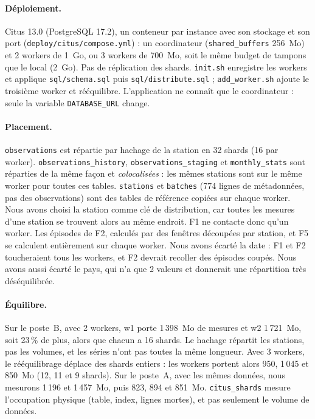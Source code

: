 \documentclass{rapportClass}
\newcommand{\cmd}[1]{\texttt{#1}}
\begin{document}
\paragraph{Déploiement.} Citus 13.0 (PostgreSQL 17.2), un conteneur par instance avec son stockage et son port
(\cmd{deploy/citus/compose.yml}) : un coordinateur (\cmd{shared\_buffers} 256~Mo) et 2 workers de 1~Go, ou 3 workers
de 700~Mo, soit le même budget de tampons que le local (2~Go). Pas de réplication des shards.
\cmd{init.sh} enregistre les workers et applique \cmd{sql/schema.sql} puis \cmd{sql/distribute.sql} ;
\cmd{add\_worker.sh} ajoute le troisième worker et rééquilibre. L'application ne connaît que le coordinateur :
seule la variable \cmd{DATABASE\_URL} change.

\paragraph{Placement.} \cmd{observations} est répartie par hachage de la station en 32 shards (16 par worker).
\cmd{observations\_history}, \cmd{observations\_staging} et \cmd{monthly\_stats} sont réparties de la même façon et
\emph{colocalisées} : les mêmes stations sont sur le même worker pour toutes ces tables. \cmd{stations} et
\cmd{batches} (774 lignes de métadonnées, pas des observations) sont des tables de référence copiées sur chaque worker.
Nous avons choisi la station comme clé de distribution, car toutes les mesures d'une station se trouvent alors
au même endroit. F1 ne contacte donc qu'un worker. Les épisodes de F2, calculés par des fenêtres découpées par
station, et F5 se calculent entièrement sur chaque worker. Nous avons écarté la date : F1 et F2 toucheraient
tous les workers, et F2 devrait recoller des épisodes coupés. Nous avons aussi écarté le pays, qui n'a que
2 valeurs et donnerait une répartition très déséquilibrée.

\paragraph{Équilibre.} Sur le poste~B, avec 2 workers, w1 porte 1\,398~Mo de mesures et w2 1\,721~Mo, soit
23\,\% de plus, alors que chacun a 16 shards. Le hachage répartit les stations, pas les volumes, et les séries
n'ont pas toutes la même longueur. Avec 3 workers, le rééquilibrage déplace des shards entiers : les workers
portent alors 950, 1\,045 et 850~Mo (12, 11 et 9 shards). Sur le poste~A, avec les mêmes données, nous mesurons
1\,196 et 1\,457~Mo, puis 823, 894 et 851~Mo. \cmd{citus\_shards} mesure l'occupation physique (table, index,
lignes mortes), et pas seulement le volume de données.
\end{document}
